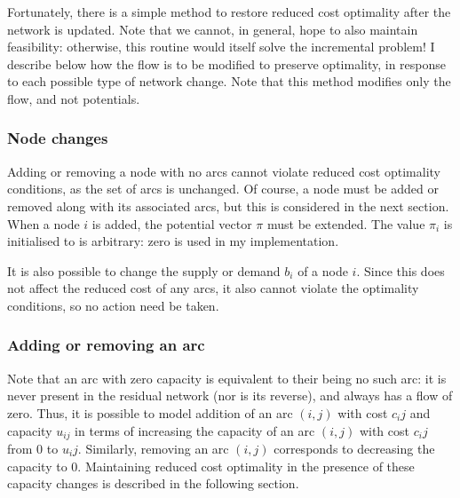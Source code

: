 Fortunately, there is a simple method to restore reduced cost optimality after the network is updated. Note that we cannot, in general, hope to also maintain feasibility\footnotemark: otherwise, this routine would itself solve the incremental problem! I describe below how the flow is to be modified to preserve optimality, in response to each possible type of network change. Note that this method modifies only the flow, and not potentials.

\subsubsection{Node changes}

Adding or removing a node with no arcs cannot violate reduced cost optimality conditions, as the set of arcs is unchanged. Of course, a node must be added or removed along with its associated arcs\footnotemark, but this is considered in the next section. When a node $i$ is added, the potential vector $\pi$ must be extended. The value $\pi_i$ is initialised to is arbitrary: zero is used in my implementation.

It is also possible to change the supply or demand $b_i$ of a node $i$\footnotemark. Since this does not affect the reduced cost of any arcs, it also cannot violate the optimality conditions, so no action need be taken.

\subsubsection{Adding or removing an arc}

Note that an arc with zero capacity is equivalent to their being no such arc: it is never present in the residual network (nor is its reverse), and always has a flow of zero. Thus, it is possible to model addition of an arc $(i,j)$ with cost $c_ij$ and capacity $u_{ij}$ in terms of increasing the capacity of an arc $(i,j)$ with cost $c_ij$ from $0$ to $u_ij$. Similarly, removing an arc $(i,j)$ corresponds to decreasing the capacity to $0$. Maintaining reduced cost optimality in the presence of these capacity changes is described in the following section.

